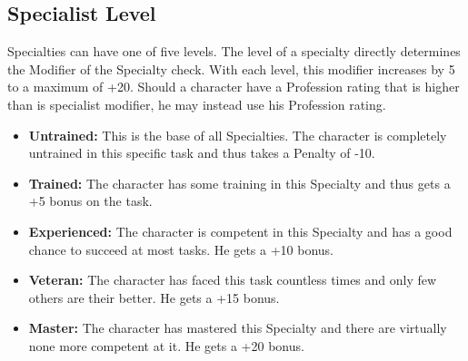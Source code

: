 \subsection{Specialist Level}
Specialties can have one of five levels. The level of a specialty directly determines the Modifier of the Specialty check. With each level, this modifier increases by 5 to a maximum of +20. Should a character have a Profession rating that is higher than is specialist modifier, he may instead use his Profession rating.
\begin{itemize}
	\item \textbf{Untrained:} This is the base of all Specialties. The character is completely untrained in this specific task and thus takes a Penalty of -10.
	\item \textbf{Trained:} The character has some training in this Specialty and thus gets a +5 bonus on the task.
	\item \textbf{Experienced:} The character is competent in this Specialty and has a good chance to succeed at most tasks. He gets a +10 bonus.
	\item \textbf{Veteran:} The character has faced this task countless times and only few others are their better. He gets a +15 bonus.
	\item \textbf{Master:} The character has mastered this Specialty and there are virtually none more competent at it. He gets a +20 bonus.
\end{itemize}

